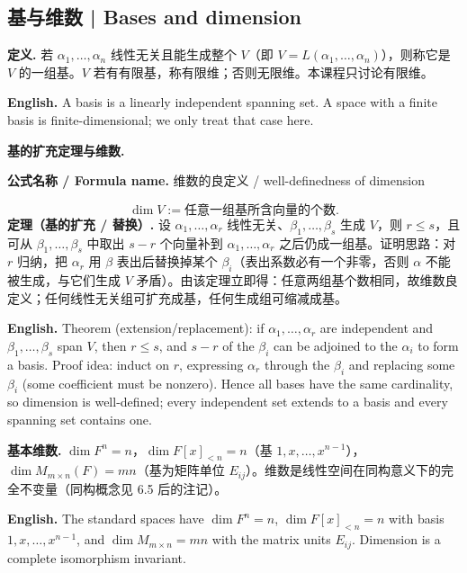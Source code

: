 \documentclass[UTF8,11pt,a4paper]{ctexart}
\newcommand{\EN}[1]{\par\noindent\textbf{English.} #1\par}
\newcommand{\FORMULA}[2]{\par\noindent\textbf{公式名称 / Formula name.} #1 / #2\par}
\begin{document}
\subsection{基与维数 | Bases and dimension}
\noindent\textbf{定义.} 若 $\alpha_1,\dots,\alpha_n$ 线性无关且能生成整个 $V$（即 $V=L(\alpha_1,\dots,\alpha_n)$），则称它是 $V$ 的一组基。$V$ 若有有限基，称有限维；否则无限维。本课程只讨论有限维。
\EN{A basis is a linearly independent spanning set. A space with a finite basis is finite-dimensional; we only treat that case here.}
\noindent\textbf{基的扩充定理与维数.}
\FORMULA{维数的良定义}{well-definedness of dimension}
\[
\dim V:=\text{任意一组基所含向量的个数}.
\]
\noindent\textbf{定理（基的扩充 / 替换）.} 设 $\alpha_1,\dots,\alpha_r$ 线性无关、$\beta_1,\dots,\beta_s$ 生成 $V$，则 $r\le s$，且可从 $\beta_1,\dots,\beta_s$ 中取出 $s-r$ 个向量补到 $\alpha_1,\dots,\alpha_r$ 之后仍成一组基。证明思路：对 $r$ 归纳，把 $\alpha_r$ 用 $\beta$ 表出后替换掉某个 $\beta_i$（表出系数必有一个非零，否则 $\alpha$ 不能被生成，与它们生成 $V$ 矛盾）。由该定理立即得：任意两组基个数相同，故维数良定义；任何线性无关组可扩充成基，任何生成组可缩减成基。
\EN{Theorem (extension/replacement): if $\alpha_1,\dots,\alpha_r$ are independent and $\beta_1,\dots,\beta_s$ span $V$, then $r\le s$, and $s-r$ of the $\beta_i$ can be adjoined to the $\alpha_i$ to form a basis. Proof idea: induct on $r$, expressing $\alpha_r$ through the $\beta_i$ and replacing some $\beta_i$ (some coefficient must be nonzero). Hence all bases have the same cardinality, so dimension is well-defined; every independent set extends to a basis and every spanning set contains one.}
\noindent\textbf{基本维数.} $\dim F^n=n$，$\dim F[x]_{<n}=n$（基 $1,x,\dots,x^{n-1}$），$\dim M_{m\times n}(F)=mn$（基为矩阵单位 $E_{ij}$）。维数是线性空间在同构意义下的完全不变量（同构概念见 6.5 后的注记）。
\EN{The standard spaces have $\dim F^n=n$, $\dim F[x]_{<n}=n$ with basis $1,x,\dots,x^{n-1}$, and $\dim M_{m\times n}=mn$ with the matrix units $E_{ij}$. Dimension is a complete isomorphism invariant.}
\end{document}
